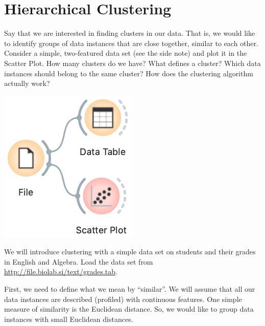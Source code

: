 \chapter{Hierarchical Clustering}
\label{ch:hierarchical_clustering}

Say that we are interested in finding clusters in our data. That is, we would like to identify groups of data instances that are close together, similar to each other. Consider a simple, two-featured data set (see the side note) and plot it in the Scatter Plot. How many clusters do we have? What defines a cluster? Which data instances should belong to the same cluster? How does the clustering algorithm actually work?

\begin{marginfigure}
    \includegraphics[scale=0.4]{workflow_scatterplot.png}
    \caption{We will introduce clustering with a simple data set on students and their grades in English and Algebra.
Load the data set from \url{http://file.biolab.si/text/grades.tab}.}
\end{marginfigure}

First, we need to define what we mean by ``similar''. We will assume that all our data instances are described (profiled) with continuous features. One simple measure of similarity is the Euclidean distance. So, we would like to group data instances with small Euclidean distances.

